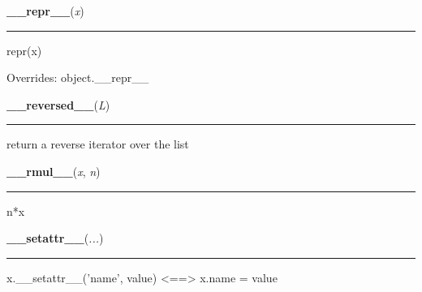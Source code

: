     \begin{boxedminipage}{\textwidth}

    \raggedright \textbf{\_\_repr\_\_}(\textit{x})

    \vspace{-1.5ex}

    \rule{\textwidth}{0.5\fboxrule}

repr(x)
    \vspace{1ex}

      Overrides: object.\_\_repr\_\_

    \end{boxedminipage}

    \label{list:__reversed__}

    \vspace{0.5ex}

    \begin{boxedminipage}{\textwidth}

    \raggedright \textbf{\_\_reversed\_\_}(\textit{L})

    \vspace{-1.5ex}

    \rule{\textwidth}{0.5\fboxrule}

return a reverse iterator over the list
    \vspace{1ex}

    \end{boxedminipage}

    \label{list:__rmul__}

    \vspace{0.5ex}

    \begin{boxedminipage}{\textwidth}

    \raggedright \textbf{\_\_rmul\_\_}(\textit{x}, \textit{n})

    \vspace{-1.5ex}

    \rule{\textwidth}{0.5\fboxrule}

n*x
    \vspace{1ex}

    \end{boxedminipage}

    \label{object:__setattr__}

    \vspace{0.5ex}

    \begin{boxedminipage}{\textwidth}

    \raggedright \textbf{\_\_setattr\_\_}(\textit{...})

    \vspace{-1.5ex}

    \rule{\textwidth}{0.5\fboxrule}

x.{\_}{\_}setattr{\_}{\_}('name', value) {\textless}=={\textgreater} x.name = value
    \vspace{1ex}

    \end{boxedminipage}

